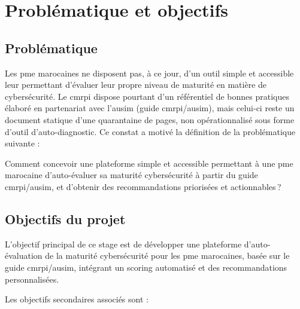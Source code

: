 \section{Problématique et objectifs}
\label{sec:problematique}

\subsection{Problématique}

\hspace{1cm}Les \gls{pme} marocaines ne disposent pas, à ce jour, d'un outil simple et accessible leur permettant d'évaluer leur propre niveau de maturité en matière de cybersécurité. Le \gls{cmrpi} dispose pourtant d'un référentiel de bonnes pratiques élaboré en partenariat avec l'\gls{ausim} (guide \gls{cmrpi}/\gls{ausim}), mais celui-ci reste un document statique d'une quarantaine de pages, non opérationnalisé sous forme d'outil d'auto-diagnostic. Ce constat a motivé la définition de la problématique suivante :

\begin{tcolorbox}[colback=iacsLight!30, colframe=iacsPrimary, boxrule=0.7pt, arc=3pt, title={\textcolor{white}{\faQuestionCircle\; Problématique}}, coltitle=white, fonttitle=\bfseries\sffamily, colbacktitle=iacsPrimary]
  Comment concevoir une plateforme simple et accessible permettant à une \gls{pme} marocaine d'auto-évaluer sa maturité cybersécurité à partir du guide \gls{cmrpi}/\gls{ausim}, et d'obtenir des recommandations priorisées et actionnables\,?
\end{tcolorbox}


\subsection{Objectifs du projet}

L'objectif principal de ce stage est de développer une plateforme d'auto-évaluation de la maturité cybersécurité pour les \gls{pme} marocaines, basée sur le guide \gls{cmrpi}/\gls{ausim}, intégrant un scoring automatisé et des recommandations personnalisées.

Les objectifs secondaires associés sont :


